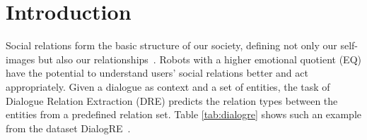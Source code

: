 \documentclass[11pt,a4paper]{article}
\begin{document}
\section{Introduction}
Social relations form the basic structure of our society, defining not only our self-images but also our relationships~\citep{sztompka2002socjologia}. Robots with a higher emotional quotient (EQ) have the potential to understand users' social relations better and act appropriately. Given a dialogue as context and a set of entities, the task of Dialogue Relation Extraction (DRE) predicts the relation types between the entities from a predefined relation set. Table \ref{tab:dialogre} shows such an example from the dataset DialogRE~\citep{yu-etal-2020-dialogue}. 
\begin{table}[]
\centering
{}
\end{table}
\end{document}
